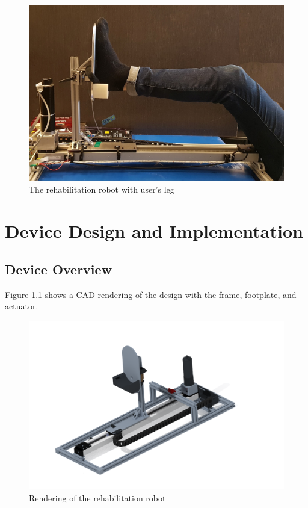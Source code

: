 \documentclass[12pt]{report}
\begin{document}
	\begin{figure}[h] 
		\centering
		\includegraphics[width=0.75\linewidth]{robot_leg}
		\caption{The rehabilitation robot with user's leg}
		\label{fig:robot_leg}
	\end{figure}
	

\chapter{Device Design and Implementation} \label{ch2}

	
		
		
	
	

	\section{Device Overview}
	
Figure \ref{fig:cad} shows a CAD rendering of the design with the frame, footplate, and actuator.

	\begin{figure}[h] 
		\centering
		\includegraphics[width=\linewidth]{robo_test1}
		\caption{Rendering of the rehabilitation robot}
		\label{fig:cad}
	\end{figure}
	
\end{document}
